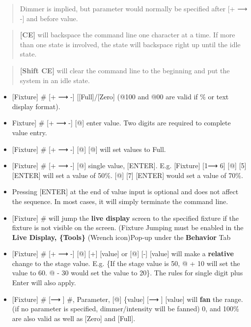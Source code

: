 \documentclass[
]{article}
\begin{document}
\begin{quote}
Dimmer is implied, but parameter would normally be specified after {[}+ ⟶ -{]} and before value.
\end{quote}

\begin{quote}
\textbf{{[}CE{]}} will backspace the command line one character at a time.
{If more than one state is involved, the state will backspace right up until the idle state}.
\end{quote}

\begin{quote}
\textbf{{[}Shift CE{]}} will clear the command line to the beginning and put the system in an idle state.
\end{quote}

\begin{itemize}
\item
  {[}Fixture{]} \# {[}+ ⟶ -{]} {[}{[}Full{]}/{[}Zero{]} (@100 and @00 are valid if \% or text display format).
\item
  Fixture{]} \# {[}+ ⟶ -{]} {[}@{]} enter value. Two digits are required to complete value entry.
\item
  {[}Fixture{]} \# {[}+ ⟶ -{]} {[}@{]} {[}@{]} will set values to Full.
\item
  {[}Fixture{]} \# {[}+ ⟶ -{]} {[}@{]} single value, {[}ENTER{]}. E.g. {[}Fixture{]} {[}1⟶ 6{]} {[}@{]} {[}5{]} {[}ENTER{]} will set a value of 50\%. {[}@{]} {[}7{]} {[}ENTER{]} would set a value of 70\%.
\item
  Pressing {[}ENTER{]} at the end of value input is optional and does not affect the sequence. In most cases, it will simply terminate the command line.
\item
  {[}Fixture{]} \# will jump the \textbf{live display} screen to the specified fixture if the fixture is not visible on the screen. (Fixture Jumping must be enabled in the \textbf{Live Display, \{Tools\}} (Wrench icon)Pop-up under the \textbf{Behavior} Tab
\item
  {[}Fixture{]} \# {[}+ ⟶ -{]} {[}@{]} {[}+{]} {[}value{]} or {[}@{]} {[}-{]} {[}value{]} will make a \textbf{relative} change to the stage value. E.g. \{If the stage value is 50, @ + 10 will set the value to 60. @ - 30 would set the value to 20\}.
  The rules for single digit plus Enter will also apply.
\item
  {[}Fixture{]} \# {[}⟶ {]} \#, Parameter, {[}@{]} \{value{]} {[}⟶ {]} {[}value{]} will \textbf{fan} the range. (if no parameter is specified, dimmer/intensity will be fanned) 0, and 100\% are also valid as well as {[}Zero{]} and {[}Full{]}.

\end{itemize}
\end{document}

